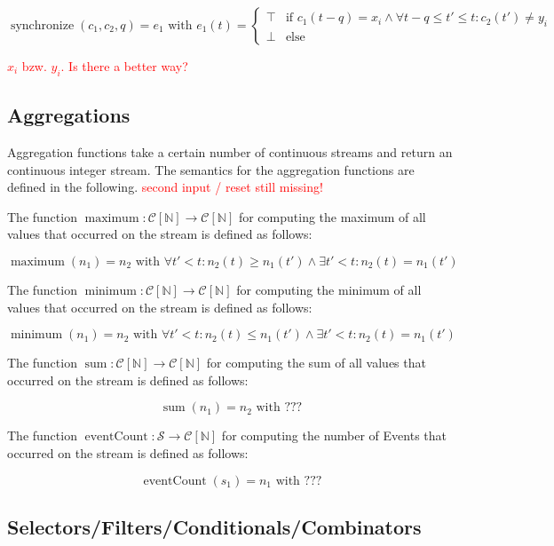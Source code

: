 \[\operatorname{synchronize}(c_1,c_2,q) = e_1 \text{ with } e_1(t) = \begin{cases}
\top & \text{if } c_1(t - q) = x_i \land \forall t-q \leq t' \leq t: c_2(t') \not= y_i \\
\bot & \text{else}
\end{cases}\]

\textcolor{red}{$x_i$ bzw. $y_i$. Is there a better way?}

\subsection{Aggregations}

Aggregation functions take a certain number of continuous streams and return an continuous integer stream. The semantics for the aggregation functions are defined in the following. \textcolor{red}{second input / reset still missing!}

The function $\operatorname{maximum}: \mathcal{C}[\mathbb{N}] \rightarrow \mathcal{C}[\mathbb{N}]$ for computing the maximum of all values that occurred on the stream is defined as follows:

\[\operatorname{maximum}(n_1) = n_2 \text{ with } \forall t' < t: n_2(t) \geq n_1(t') \land \exists t' < t: n_2(t) = n_1(t')\]

The function $\operatorname{minimum}: \mathcal{C}[\mathbb{N}] \rightarrow \mathcal{C}[\mathbb{N}]$ for computing the minimum of all values that occurred on the stream is defined as follows:

\[\operatorname{minimum}(n_1) = n_2 \text{ with } \forall t' < t: n_2(t) \leq n_1(t') \land \exists t' < t: n_2(t) = n_1(t')\]

The function $\operatorname{sum}: \mathcal{C}[\mathbb{N}] \rightarrow \mathcal{C}[\mathbb{N}]$ for computing the sum of all values that occurred on the stream is defined as follows:

\[\operatorname{sum}(n_1) = n_2 \text{ with } ???\]

The function $\operatorname{eventCount}: \mathcal{S} \rightarrow \mathcal{C}[\mathbb{N}]$ for computing the number of Events that occurred on the stream is defined as follows:

\[\operatorname{eventCount}(s_1) = n_1 \text{ with } ???\]

\subsection{Selectors/Filters/Conditionals/Combinators}

